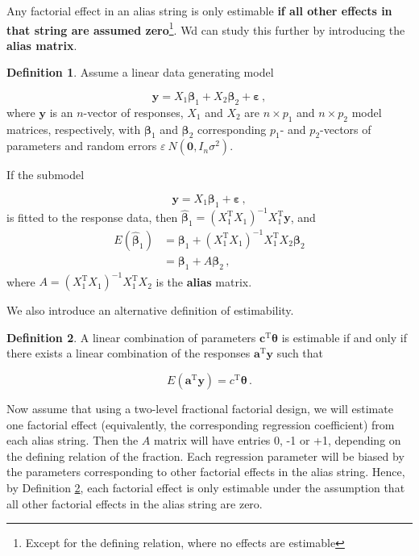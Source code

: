 \documentclass[
]{book}
\theoremstyle{definition}
\newtheorem{definition}{Definition}[chapter]
\theoremstyle{definition}
\theoremstyle{definition}
\theoremstyle{definition}
\theoremstyle{remark}
\begin{document}
Any factorial effect in an alias string is only estimable \textbf{if all other effects in that string are assumed zero}\footnote{Except for the defining relation, where no effects are estimable}. Wd can study this further by introducing the \textbf{alias matrix}.

\begin{definition}
\protect\hypertarget{def:alias-matrix}{}\label{def:alias-matrix}Assume a linear data generating model

\[
\boldsymbol{y}= X_1\boldsymbol{\beta}_1 + X_2\boldsymbol{\beta}_2 + \boldsymbol{\varepsilon}\,,
\]
where \(\boldsymbol{y}\) is an \(n\)-vector of responses, \(X_1\) and \(X_2\) are \(n\times p_1\) and \(n\times p_2\) model matrices, respectively, with \(\boldsymbol{\beta}_1\) and \(\boldsymbol{\beta}_2\) corresponding \(p_1\)- and \(p_2\)-vectors of parameters and random errors \(\varepsilon ~ N(\boldsymbol{0}, I_n\sigma^2)\).

If the submodel

\[
\boldsymbol{y}= X_1\boldsymbol{\beta}_1 + \boldsymbol{\varepsilon}\,,
\]
is fitted to the response data, then \(\hat{\boldsymbol{\beta}}_1 = (X_1^{\mathrm{T}}X_1)^{-1}X_1^{\mathrm{T}}\boldsymbol{y}\), and
\begin{align*}
E(\hat{\boldsymbol{\beta}}_1) & = \boldsymbol{\beta}_1 + (X_1^{\mathrm{T}}X_1)^{-1}X_1^{\mathrm{T}}X_2\boldsymbol{\beta}_2 \\
& = \boldsymbol{\beta}_1 + A\boldsymbol{\beta}_2\,,
\end{align*}
where \(A = (X_1^{\mathrm{T}}X_1)^{-1}X_1^{\mathrm{T}}X_2\) is the \textbf{alias} matrix.
\end{definition}

We also introduce an alternative definition of estimability.

\begin{definition}
\protect\hypertarget{def:alt-estimability}{}\label{def:alt-estimability}A linear combination of parameters \(\boldsymbol{c}^{\mathrm{T}}\boldsymbol{\theta}\) is estimable if and only if there exists a linear combination of the responses \(\boldsymbol{a}^{\mathrm{T}}\boldsymbol{y}\) such that

\[
E(\boldsymbol{a}^{\mathrm{T}}\boldsymbol{y}) = c^{\mathrm{T}}\boldsymbol{\theta}\,.
\]
\end{definition}

Now assume that using a two-level fractional factorial design, we will estimate one factorial effect (equivalently, the corresponding regression coefficient) from each alias string. Then the \(A\) matrix will have entries 0, -1 or +1, depending on the defining relation of the fraction. Each regression parameter will be biased by the parameters corresponding to other factorial effects in the alias string. Hence, by Definition \ref{def:alt-estimability}, each factorial effect is only estimable under the assumption that all other factorial effects in the alias string are zero.
\end{document}
